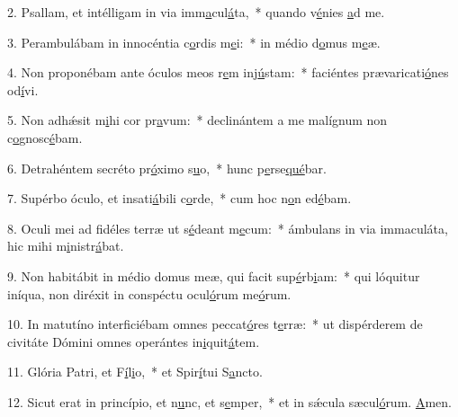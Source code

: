 2. Psallam, et intélligam in via imm\uline{a}cul\uline{á}ta,~* quando v\uline{é}nies \uline{a}d me.\par 
3. Perambulábam in innocéntia c\uline{o}rdis m\uline{e}i:~* in médio d\uline{o}mus m\uline{e}æ.\par 
4. Non proponébam ante óculos meos r\uline{e}m inj\uline{ú}stam:~* faciéntes prævaricati\uline{ó}nes od\uline{í}vi.\par 
5. Non adhǽsit m\uline{i}hi cor pr\uline{a}vum:~* declinántem a me malígnum non c\uline{o}gnosc\uline{é}bam.\par 
6. Detrahéntem secréto pr\uline{ó}ximo s\uline{u}o,~* hunc p\uline{e}rse\uline{qué}bar.\par 
7. Supérbo óculo, et insati\uline{á}bili c\uline{o}rde,~* cum hoc n\uline{o}n ed\uline{é}bam.\par 
8. Oculi mei ad fidéles terræ ut s\uline{é}deant m\uline{e}cum:~* ámbulans in via immaculáta, hic mihi m\uline{i}nistr\uline{á}bat.\par 
9. Non habitábit in médio domus meæ, qui facit sup\uline{é}rb\uline{i}am:~* qui lóquitur iníqua, non diréxit in conspéctu ocul\uline{ó}rum me\uline{ó}rum.\par 
10. In matutíno interficiébam omnes peccat\uline{ó}res t\uline{e}rræ:~* ut dispérderem de civitáte Dómini omnes operántes in\uline{i}quit\uline{á}tem.\par 
11. Glória Patri, et F\uline{í}l\uline{i}o,~* et Spir\uline{í}tui S\uline{a}ncto.\par 
12. Sicut erat in princípio, et n\uline{u}nc, et s\uline{e}mper,~* et in sǽcula sæcul\uline{ó}rum. \uline{A}men.\par 
